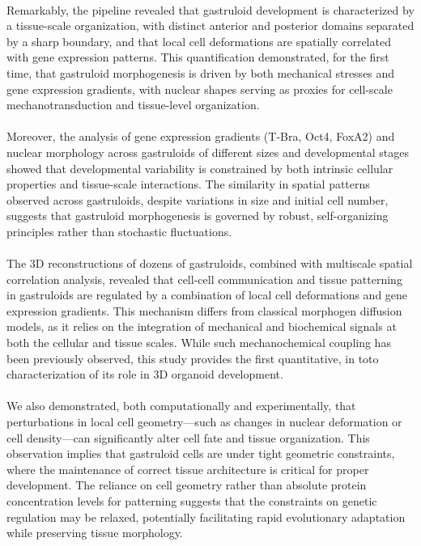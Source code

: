 \paragraph{}Remarkably, the pipeline revealed that gastruloid development is characterized by a tissue-scale organization, with distinct anterior and posterior domains separated by a sharp boundary, and that local cell deformations are spatially correlated with gene expression patterns.
This quantification demonstrated, for the first time, that gastruloid morphogenesis is driven by both mechanical stresses and gene expression gradients, with nuclear shapes serving as proxies for cell-scale mechanotransduction and tissue-level organization.

\paragraph{}Moreover, the analysis of gene expression gradients (T-Bra, Oct4, FoxA2) and nuclear morphology across gastruloids of different sizes and developmental stages showed that developmental variability is constrained by both intrinsic cellular properties and tissue-scale interactions.
The similarity in spatial patterns observed across gastruloids, despite variations in size and initial cell number, suggests that gastruloid morphogenesis is governed by robust, self-organizing principles rather than stochastic fluctuations.

\paragraph{}The 3D reconstructions of dozens of gastruloids, combined with multiscale spatial correlation analysis, revealed that cell-cell communication and tissue patterning in gastruloids are regulated by a combination of local cell deformations and gene expression gradients.
This mechanism differs from classical morphogen diffusion models, as it relies on the integration of mechanical and biochemical signals at both the cellular and tissue scales. While such mechanochemical coupling has been previously observed, this study provides the first quantitative, in toto characterization of its role in 3D organoid development.

\paragraph{}We also demonstrated, both computationally and experimentally, that perturbations in local cell geometry—such as changes in nuclear deformation or cell density—can significantly alter cell fate and tissue organization.
This observation implies that gastruloid cells are under tight geometric constraints, where the maintenance of correct tissue architecture is critical for proper development.
The reliance on cell geometry rather than absolute protein concentration levels for patterning suggests that the constraints on genetic regulation may be relaxed, potentially facilitating rapid evolutionary adaptation while preserving tissue morphology.

